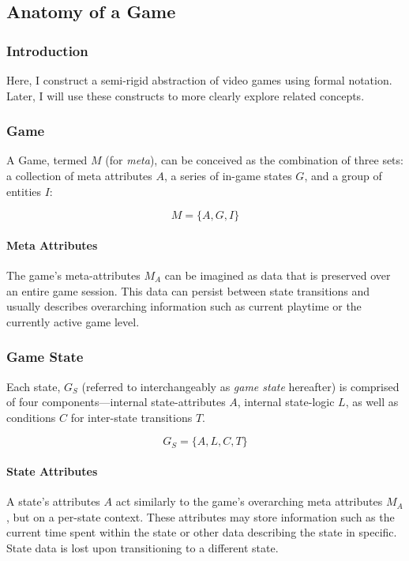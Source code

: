 \documentclass{report}
\begin{document}
\subsection{Anatomy of a Game}
\subsubsection{Introduction}
Here, I construct a semi-rigid abstraction of video games using formal notation. Later, I will use these constructs to more clearly explore related concepts.


\subsubsection{Game}
A Game, termed $M$ (for \emph{meta}), can be conceived as the combination of three sets: a collection of meta attributes $A$, a series of in-game states $G$, and a group of entities $I$:

$$
M = \{A, G, I\}
$$

\paragraph{Meta Attributes}
The game's meta-attributes $M_A$ can be imagined as data that is preserved over an entire game session. This data can persist between state transitions and usually describes overarching information such as current playtime or the currently active game level. 

\subsubsection{Game State}
Each state, $G_S$ (referred to interchangeably as \textit{game state} hereafter) is comprised of four components---internal state-attributes $A$, internal state-logic $L$, as well as conditions $C$ for inter-state transitions $T$.

$$
G_S = \{ A, L, C, T \}
$$

\paragraph{State Attributes}
A state's attributes $A$ act similarly to the game's overarching meta attributes $M_A$, but on a per-state context. These attributes may store information such as the current time spent within the state or other data describing the state in specific. State data is lost upon transitioning to a different state.
\end{document}
